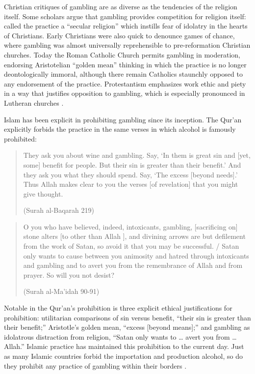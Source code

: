 \documentclass[american]{../../../coursework}
\begin{document}
Christian critiques of gambling are as diverse as the tendencies of the religion itself. Some scholars argue that gambling provides competition for religion itself: \textcite{Ful74} called the practice a ``secular religion'' which instills fear of idolatry in the hearts of Christians. Early Christians were also quick to denounce games of chance, where gambling was almost universally reprehensible to pre-reformation Christian churches. Today the Roman Catholic Church permits gambling in moderation, endorsing Aristotelian ``golden mean'' thinking in which the practice is no longer deontologically immoral, although there remain Catholics staunchly opposed to any endorsement of the practice. Protestantism emphasizes work ethic and piety in a way that justifies opposition to gambling, which is especially pronounced in Lutheran churches \parencite{Bin07}.

Islam has been explicit in prohibiting gambling since its inception. The Qur'an explicitly forbids the practice in the same verses in which alcohol is famously prohibited:

\begin{quote}
    They ask you about wine and gambling. Say, `In them is great sin and [yet, some] benefit for people. But their sin is greater than their benefit.' And they ask you what they should spend. Say, `The excess [beyond needs].' Thus Allah makes clear to you the verses [of revelation] that you might give thought.

    (Surah al-Baqarah 219)
\end{quote}

\begin{quote}
    O you who have believed, indeed, intoxicants, gambling, [sacrificing on] stone alters [to other than Allah ], and divining arrows are but defilement from the work of Satan, so avoid it that you may be successful. / Satan only wants to cause between you animosity and hatred through intoxicants and gambling and to avert you from the remembrance of Allah and from prayer. So will you not desist?

    (Surah al-Ma'idah 90-91)
\end{quote}

Notable in the Qur'an's prohibition is three explicit ethical justifications for prohibition: utilitarian comparisons of sin versus benefit, ``their sin is greater than their benefit;'' Aristotle's golden mean, ``excess [beyond means];'' and gambling as idolatrous distraction from religion, ``Satan only wants to … avert you from … Allah.'' Islamic practice has maintained this prohibition to the current day. Just as many Islamic countries forbid the importation and production alcohol, so do they prohibit any practice of gambling within their borders \parencite{Bin07}.
\end{document}
